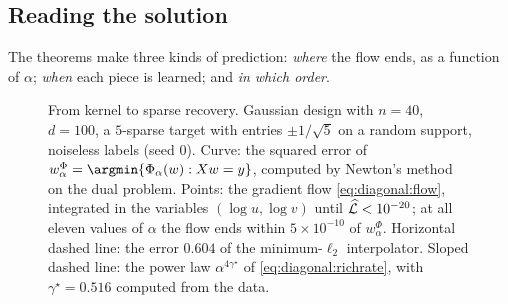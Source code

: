\begin{refsection}
\section{Reading the solution}\label{sec:diagonal:reading}

The theorems make three kinds of prediction: \emph{where} the flow ends, as a function of $\alpha$; \emph{when} each piece is learned; and \emph{in which order}.

\begin{figure}[t]
\centering
{}
\caption{From kernel to sparse recovery. Gaussian design with $n=40$, $d=100$, a $5$-sparse target with entries $\pm1/\sqrt5$ on a random support, noiseless labels (seed $0$). Curve: the squared error of $w^\Phi_\alpha=\argmin\{\Phi_\alpha(w):Xw=y\}$, computed by Newton's method on the dual problem. Points: the gradient flow \eqref{eq:diagonal:flow}, integrated in the variables $(\log u,\log v)$ until $\widehat{\mathcal{L}}<10^{-20}$; at all eleven values of $\alpha$ the flow ends within $5\times10^{-10}$ of $w^\Phi_\alpha$. Horizontal dashed line: the error $0.604$ of the minimum-$\ell_2$ interpolator. Sloped dashed line: the power law $\alpha^{4\gamma^\star}$ of \eqref{eq:diagonal:richrate}, with $\gamma^\star=0.516$ computed from the data.}\label{fig:diagonal:sparse}
\end{figure}


\end{refsection}
